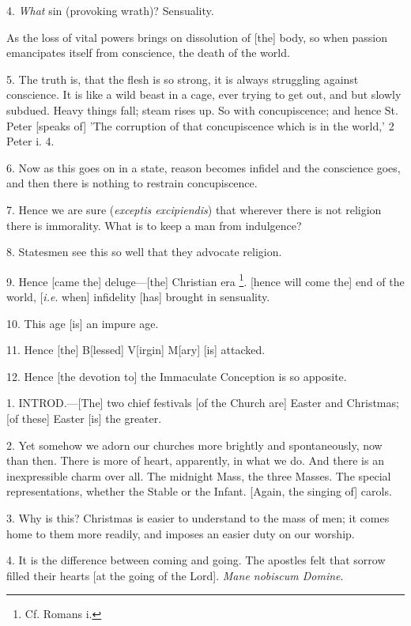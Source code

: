 4. \emph{What} sin (provoking wrath)? Sensuality.

As the loss of vital powers brings on dissolution
of [the] body, so when passion emancipates itself from conscience, the
death of the world.

5. The truth is, that the flesh is so strong, it
is always struggling against conscience. It is like a wild beast in a
cage, ever trying to get out, and but slowly subdued. Heavy things
fall; steam rises up. So with concupiscence; and hence St. Peter
[speaks of] 'The corruption of that concupiscence which is in the
world,' 2 Peter i. 4.

6. Now as this goes on in a state, reason becomes
infidel and the conscience goes, and then there is nothing to restrain
concupiscence.

7. Hence we are sure (\emph{exceptis excipiendis})
that wherever there is not religion there is immorality. What is to
keep a man from indulgence?

8. Statesmen see this so well that they advocate
religion.

9. Hence [came the] deluge—[the] Christian era
\footnote{Cf. Romans i.}. [hence will come
the] end of the world, [\emph{i.e}. when] infidelity [has] brought in
sensuality.

10. This age [is] an impure age.

11. Hence [the] B[lessed] V[irgin] M[ary] [is]
attacked.

12. Hence [the devotion to] the Immaculate
Conception is so apposite.


1. INTROD.—[The]
two chief festivals [of the Church are] Easter and Christmas; [of
these] Easter [is] the greater.

2. Yet somehow we adorn our churches more
brightly and spontaneously, now than then. There is more of heart,
apparently, in what we do. And there is an inexpressible charm over
all. The midnight Mass, the three Masses. The special representations,
whether the Stable or the Infant. [Again, the singing of] carols.

3. Why is this? Christmas is easier to understand
to the mass of men; it comes home to them more readily, and imposes an
easier duty on our worship.

4. It is the difference between coming and going.
The apostles felt that sorrow filled their hearts [at the going of the
Lord]. \emph{Mane nobiscum Domine}.

